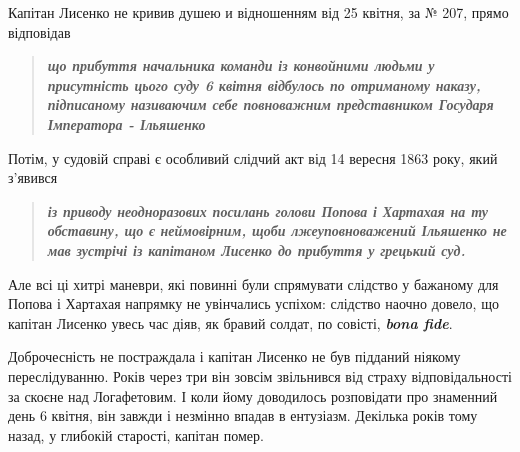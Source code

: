\documentclass[a4paper,20pt]{report}
\begin{document}
Капітан Лисенко не кривив душею и відношенням від 25 квітня, за № 207, прямо 
відповідав

\begin{quote}
\em\bfseries
що прибуття начальника команди із конвойними людьми у присутність цього суду 6
квітня відбулось по отриманому наказу, підписаному називаючим себе
повноважним представником Государя Імператора - Ільяшенко
\end{quote}
Потім, у судовій справі є особливий слідчий акт від 14 вересня 1863 року, який з'явився
\begin{quote}
\em\bfseries
із приводу неодноразових посилань голови Попова і Хартахая на ту обставину, що є неймовірним,
щоби лжеуповноважений Ільяшенко не мав зустрічі із капітаном Лисенко до прибуття у грецький суд.
\end{quote}

Але всі ці хитрі маневри, які повинні були спрямувати слідство у бажаному для Попова і Хартахая
напрямку не увінчались успіхом: слідство наочно довело, що капітан Лисенко увесь час діяв, як бравий солдат,
по совісті, \textbf{\em bona fide}.

Доброчесність не постраждала і капітан Лисенко не був підданий ніякому
переслідуванню. Років через три він зовсім звільнився від страху
відповідальності за скоєне над Логафетовим. І коли йому доводилось розповідати
про знаменний день 6 квітня, він завжди і незмінно впадав в ентузіазм. Декілька
років тому назад, у глибокій старості, капітан помер.
\end{document}
